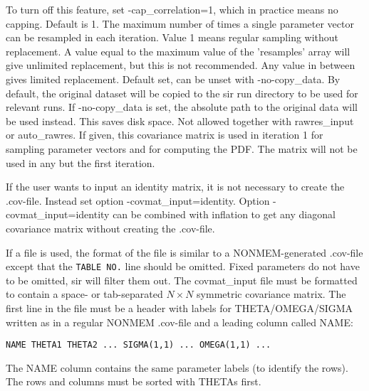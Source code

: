 \begin{optionlist}
To turn off this feature, set -cap\_correlation=1, which in practice means no capping.
\nextopt
{}
Default is 1. The maximum number of times a single parameter vector can be resampled in each iteration. Value 1 means regular sampling without replacement. A value equal to the maximum value of the 'resamples' array will give unlimited replacement, but this is not recommended. Any value in between gives limited replacement.
\nextopt
{}
Default set, can be unset with -no-copy\_data. By default, the original dataset will be copied to the sir run directory to be used for relevant runs. If -no-copy\_data is set, the absolute path to the original data will be used instead. This saves disk space.
\nextopt
{}
Not allowed together with rawres\_input or auto\_rawres. If given, this covariance matrix is used in iteration 1 for sampling parameter vectors and for computing the PDF. The matrix will not be used in any but the first iteration. 

If the user wants to input an identity matrix, it is not necessary to create the .cov-file. Instead set option -covmat\_input=identity. Option -covmat\_input=identity can be combined with inflation to get any diagonal covariance matrix without creating the .cov-file.

If a file is used, the format of the file is similar to a NONMEM-generated .cov-file except that the \verb|TABLE NO.| line should be omitted. Fixed parameters do not have to be omitted, sir will filter them out. The covmat\_input file must be formatted to contain a space- or tab-separated  $N\times N$ symmetric covariance matrix. The first line in the file must be a header with labels for THETA/OMEGA/SIGMA written as in a regular NONMEM .cov-file and a leading column called NAME:
\begin{verbatim}
NAME THETA1 THETA2 ... SIGMA(1,1) ... OMEGA(1,1) ...
\end{verbatim}
The NAME column contains the same parameter labels (to identify the rows). The rows and columns must be sorted with THETAs first.


\end{optionlist}
